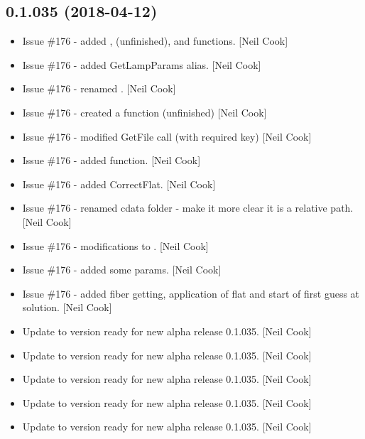 \documentclass[a4paper,10pt,english]{report}
\begin{document}
\subsection{0.1.035 (2018-04-12)}
\label{\detokenize{misc/changelog:id464}}\begin{itemize}
\item {} 
Issue \#176 - added , 
(unfinished), and  functions. {[}Neil Cook{]}

\item {} 
Issue \#176 - added GetLampParams alias. {[}Neil Cook{]}

\item {} 
Issue \#176 - renamed . {[}Neil Cook{]}

\item {} 
Issue \#176 - created a  function (unfinished) {[}Neil
Cook{]}

\item {} 
Issue \#176 - modified GetFile call (with required key) {[}Neil Cook{]}

\item {} 
Issue \#176 - added  function. {[}Neil Cook{]}

\item {} 
Issue \#176 - added CorrectFlat. {[}Neil Cook{]}

\item {} 
Issue \#176 - renamed cdata folder - make it more clear it is a
relative path. {[}Neil Cook{]}

\item {} 
Issue \#176 - modifications to . {[}Neil Cook{]}

\item {} 
Issue \#176 - added some  params. {[}Neil Cook{]}

\item {} 
Issue \#176 - added fiber getting, application of flat and start of
first guess at solution. {[}Neil Cook{]}

\item {} 
Update to version ready for new alpha release 0.1.035. {[}Neil Cook{]}

\item {} 
Update to version ready for new alpha release 0.1.035. {[}Neil Cook{]}

\item {} 
Update to version ready for new alpha release 0.1.035. {[}Neil Cook{]}

\item {} 
Update to version ready for new alpha release 0.1.035. {[}Neil Cook{]}

\item {} 
Update to version ready for new alpha release 0.1.035. {[}Neil Cook{]}

\end{itemize}
\end{document}
